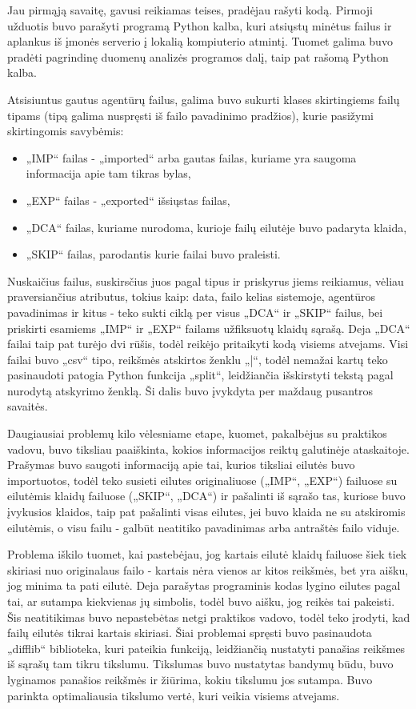 \documentclass{VUMIFPSkursinis}
\begin{document}
Jau pirmąją savaitę, gavusi reikiamas teises, pradėjau rašyti kodą. Pirmoji užduotis buvo parašyti programą Python kalba, kuri atsiųstų minėtus failus ir aplankus iš įmonės serverio į lokalią kompiuterio atmintį. Tuomet galima buvo pradėti pagrindinę duomenų analizės programos dalį, taip pat rašomą Python kalba. 

Atsisiuntus gautus agentūrų failus, galima buvo sukurti klases skirtingiems failų tipams (tipą galima nuspręsti iš failo pavadinimo pradžios), kurie pasižymi skirtingomis savybėmis:
\begin{itemize}
    \item „IMP“ failas - „imported“ arba gautas failas, kuriame yra saugoma informacija apie tam tikras bylas,
    \item „EXP“ failas - „exported“ išsiųstas failas,
    \item „DCA“ failas, kuriame nurodoma, kurioje failų eilutėje buvo padaryta klaida,
    \item „SKIP“ failas, parodantis kurie failai buvo praleisti.
\end{itemize}
Nuskaičius failus, suskirsčius juos pagal tipus ir priskyrus jiems reikiamus, vėliau praversiančius atributus, tokius kaip: data, failo kelias sistemoje, agentūros pavadinimas ir kitus - teko sukti ciklą per visus „DCA“ ir „SKIP“ failus, bei priskirti esamiems „IMP“ ir „EXP“ failams užfiksuotų klaidų sąrašą. Deja „DCA“ failai taip pat turėjo dvi rūšis, todėl reikėjo pritaikyti kodą visiems atvejams. Visi failai buvo „csv“ tipo, reikšmės atskirtos ženklu „|“, todėl nemažai kartų teko pasinaudoti patogia Python funkcija „split“, leidžiančia išskirstyti tekstą pagal nurodytą atskyrimo ženklą. Ši dalis buvo įvykdyta per maždaug pusantros savaitės.

Daugiausiai problemų kilo vėlesniame etape, kuomet, pakalbėjus su praktikos vadovu, buvo tiksliau paaiškinta, kokios informacijos reiktų galutinėje ataskaitoje. Prašymas buvo saugoti informaciją apie tai, kurios tiksliai eilutės buvo importuotos, todėl teko susieti eilutes originaliuose („IMP“, „EXP“) failuose su eilutėmis klaidų failuose („SKIP“, „DCA“) ir pašalinti iš sąrašo tas, kuriose buvo įvykusios klaidos, taip pat pašalinti visas eilutes, jei buvo klaida ne su atskiromis eilutėmis, o visu failu - galbūt neatitiko pavadinimas arba antraštės failo viduje.

Problema iškilo tuomet, kai pastebėjau, jog kartais eilutė klaidų failuose šiek tiek skiriasi nuo originalaus failo - kartais nėra vienos ar kitos reikšmės, bet yra aišku, jog minima ta pati eilutė. Deja parašytas programinis kodas lygino eilutes pagal tai, ar sutampa kiekvienas jų simbolis, todėl buvo aišku, jog reikės tai pakeisti. Šis neatitikimas buvo nepastebėtas netgi praktikos vadovo, todėl teko įrodyti, kad failų eilutės tikrai kartais skiriasi. Šiai problemai spręsti buvo pasinaudota „difflib“ biblioteka, kuri pateikia funkciją, leidžiančią nustatyti panašias reikšmes iš sąrašų tam tikru tikslumu. Tikslumas buvo nustatytas bandymų būdu, buvo lyginamos panašios reikšmės ir žiūrima, kokiu tikslumu jos sutampa. Buvo parinkta optimaliausia tikslumo vertė, kuri veikia visiems atvejams.
\end{document}
